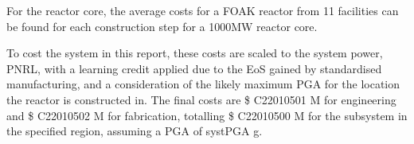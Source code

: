 For the reactor core, the average costs for a FOAK reactor from 11 facilities can be found for each construction step for a 1000MW reactor core.

To cost the system in this report, these costs are scaled to the system power, PNRL, with a learning credit applied due to the EoS gained by standardised manufacturing, and a consideration of the likely maximum PGA for the location the reactor is constructed in. The final costs are \$ C22010501 M for engineering and \$ C22010502 M for fabrication, totalling \$ C22010500 M for the subsystem in the specified region, assuming a PGA of systPGA g.
